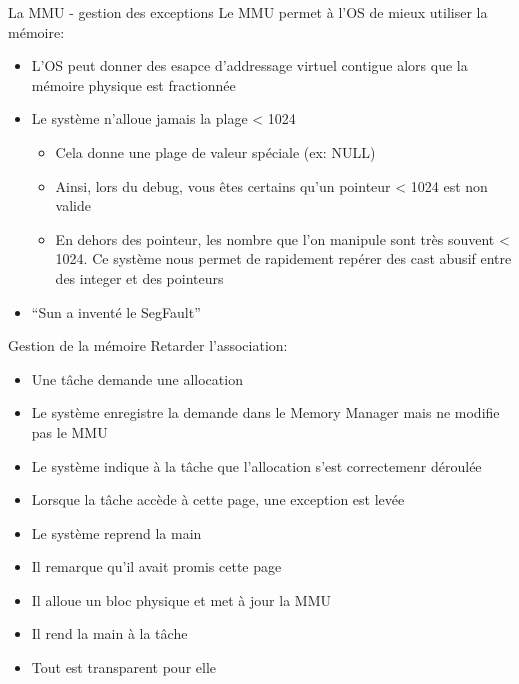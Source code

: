 \begin{frame}{La MMU - gestion des exceptions}
  Le MMU permet à l'OS de mieux utiliser la mémoire:
  \begin{itemize} 
  \item  L'OS peut  donner  des esapce  d'addressage virtuel  contigue
    alors que la mémoire physique est fractionnée
  \item Le système n'alloue jamais la plage < 1024
    \begin{itemize}
    \item Cela donne une plage de valeur spéciale (ex: NULL)
    \item Ainsi,  lors du debug,  vous êtes certains qu'un  pointeur <
      1024 est non valide
    \item En  dehors des pointeur,  les nombre que l'on  manipule sont
      très  souvent <  1024.   Ce système  nous  permet de  rapidement
      repérer des cast abusif entre des integer et des pointeurs
    \end{itemize} 
  \item ``Sun a inventé le SegFault''
  \end{itemize} 
\end{frame}

\begin{frame}{ Gestion de la mémoire}
  Retarder l'association:
  \begin{itemize}
  \item Une tâche demande une allocation
  \item Le système  enregistre la demande dans le  Memory Manager mais
    ne modifie pas le MMU
  \item  Le  système  indique   à  la  tâche  que  l'allocation  s'est
    correctemenr déroulée
  \item Lorsque la tâche accède à cette page, une exception est levée
  \item Le système reprend la main
  \item Il remarque qu'il avait promis cette page
  \item Il alloue un bloc physique et met à jour la MMU
  \item Il rend la main à la tâche
  \item Tout est transparent pour elle
  \end{itemize}
\end{frame}

